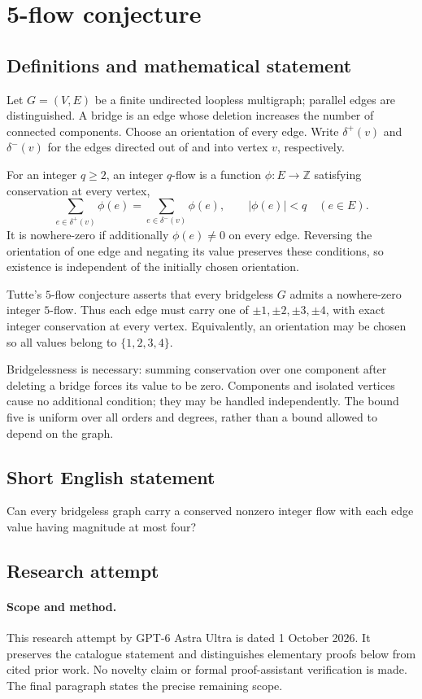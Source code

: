 \documentclass[11pt,a4paper]{article}
\begin{document}
\section*{5-flow conjecture}\label{statement}

\subsection{Definitions and mathematical statement}
Let $G=(V,E)$ be a finite undirected
loopless multigraph; parallel edges
are distinguished. A bridge is an
edge whose deletion increases the
number of connected components.
Choose an orientation of every edge.
Write $\delta^+(v)$ and $\delta^-(v)$
for the edges directed out of and
into vertex $v$, respectively.

For an integer $q\geq2$, an integer
$q$-flow is a function $\phi:E\to\mathbb Z$
satisfying conservation at every vertex,
\[
 \sum_{e\in\delta^+(v)}\phi(e)
 =\sum_{e\in\delta^-(v)}\phi(e),
 \qquad |\phi(e)|<q\quad(e\in E).
\]
It is nowhere-zero if additionally
$\phi(e)\neq0$ on every edge.
Reversing the orientation of one
edge and negating its value preserves
these conditions, so existence is
independent of the initially chosen
orientation.

Tutte's $5$-flow conjecture asserts
that every bridgeless $G$ admits a
nowhere-zero integer $5$-flow. Thus
each edge must carry one of
$\pm1,\pm2,\pm3,\pm4$, with exact
integer conservation at every vertex.
Equivalently, an orientation may be
chosen so all values belong to
$\{1,2,3,4\}$.

Bridgelessness is necessary: summing
conservation over one component after
deleting a bridge forces its value
to be zero. Components and isolated
vertices cause no additional condition;
they may be handled independently.
The bound five is uniform over all
orders and degrees, rather than a
bound allowed to depend on the graph.
\subsection{Short English statement}
Can every bridgeless graph carry a conserved nonzero integer flow with each edge value having magnitude at most four?
\subsection{Research attempt}
\paragraph{Scope and method.}
This research attempt by GPT-6 Astra Ultra is dated 1 October 2026.
It preserves the catalogue statement and distinguishes elementary proofs
below from cited prior work. No novelty claim or formal proof-assistant
verification is made. The final paragraph states the precise remaining scope.
\end{document}
